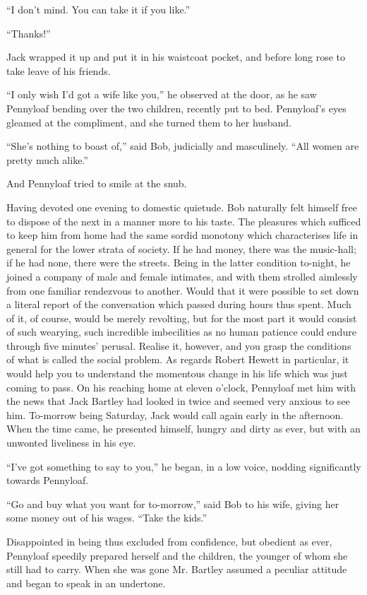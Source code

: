 ``I don't mind. You can take it if you like.''

``Thanks!''

Jack wrapped it up and put it in his waistcoat pocket, and before long
rose to take leave of his friends.

``I only wish I'd got a wife like you,'' he observed at the door, as he
saw Pennyloaf bending over the two children, recently put to bed.
{\protect\hypertarget{230}{}{}}Pennyloaf's eyes gleamed at the
compliment, and she turned them to her husband.

``She's nothing to boast of,'' said Bob, judicially and masculinely.
``All women are pretty much alike.''

And Pennyloaf tried to smile at the snub.

Having devoted one evening to domestic quietude. Bob naturally felt
himself free to dispose of the next in a manner more to his taste. The
pleasures which sufficed to keep him from home had the same sordid
monotony which characterises life in general for the lower strata of
society. If he had money, there was the music-hall; if he had none,
there were the streets. Being in the latter condition to-night, he
joined a company of male and female intimates, and with them strolled
aimlessly from one familiar rendezvous to another. Would that it were
possible to set down a literal report of the conversation which passed
during hours thus spent. Much of it, of course, would be merely
revolting, but for the most part it would consist of such wearying, such
incredible imbecilities as no human
{\protect\hypertarget{231}{}{}}patience could endure through five
minutes' perusal. Realise it, however, and you grasp the conditions of
what is called the social problem. As regards Robert Hewett in
particular, it would help you to understand the momentous change in his
life which was just coming to pass. On his reaching home at eleven
o'clock, Pennyloaf met him with the news that Jack Bartley had looked in
twice and seemed very anxious to see him. To-morrow being Saturday, Jack
would call again early in the afternoon. When the time came, he
presented himself, hungry and dirty as ever, but with an unwonted
liveliness in his eye.

``I've got something to say to you,'' he began, in a low voice, nodding
significantly towards Pennyloaf.

``Go and buy what you want for to-morrow,'' said Bob to his wife, giving
her some money out of his wages. ``Take the kids.''

Disappointed in being thus excluded from confidence, but obedient as
ever, Pennyloaf speedily prepared herself and the children, the
{\protect\hypertarget{232}{}{}}younger of whom she still had to carry.
When she was gone Mr. Bartley assumed a peculiar attitude and began to
speak in an undertone.

